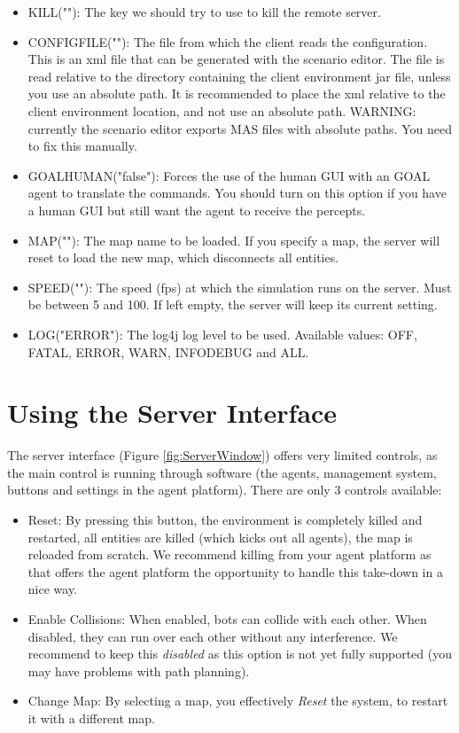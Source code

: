 \documentclass[11pt,a4paper]{article}
\begin{document}
\begin{itemize}
\item
    KILL(""):
  The key we should try to use to kill the remote server.
 
\item
    CONFIGFILE(""):
    The file from which the client reads the configuration. This is an xml file that can be generated with the scenario editor. The file is read relative to the directory containing the client environment jar file, unless you use an absolute path. It is recommended to place the xml relative to the client environment location, and not use an absolute path. WARNING: currently the scenario editor exports MAS files with absolute paths. You need to fix this manually.
 
\item
    GOALHUMAN("false"):
    Forces the use of the human GUI with an GOAL agent to translate the commands. You should turn on this option if you have a human GUI but still want the agent to receive the percepts.

\item
    MAP(""):
    The map name to be loaded. If you specify a map, the server will reset to load the new map, which disconnects all entities.
     
\item    
    SPEED(""):
    The speed (fps) at which the simulation runs on the server. Must be between 5 and 100. If left empty, the server will keep its current setting.

\item    
    LOG("ERROR"):
    The log4j log level to be used. Available values: OFF, FATAL, ERROR, WARN, INFODEBUG and ALL.

\end{itemize}


\section{Using the Server Interface}
The server interface (Figure \ref{fig:ServerWindow}) offers very limited controls, as the main control is running through software (the agents, management system, buttons and settings in the agent platform). There are only 3 controls available:
\begin{itemize}
\item{Reset}: By pressing this button, the environment is completely killed and restarted, all entities are killed (which kicks out all agents), the map is reloaded from scratch. We recommend killing from your agent platform as that offers the agent platform the opportunity to handle this take-down in a nice way.
\item{Enable Collisions}: When enabled, bots can collide with each other. When disabled, they can run over each other without any interference. We recommend to keep this \emph{disabled} as this option is not yet fully supported (you may have problems with path planning).
\item{Change Map}: By selecting a map, you effectively \emph{Reset} the system, to restart it with a different map.
\end{itemize}
\end{document}
